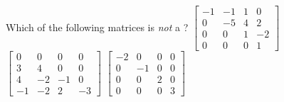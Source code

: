 \begin{activity}
Which of the following matrices is \emph{not} a ?
{\(\begin{bmatrix} -1&-1&1&0
\\0&-5&4&2
\\0&0&1&-2
\\0&0&0&1 \end{bmatrix}\)}
{\(\begin{bmatrix} 0&0&0&0
\\3&4&0&0
\\4&-2&-1&0
\\-1&-2&2&-3 \end{bmatrix}\)}
{\(\begin{bmatrix} -2&0&0&0
\\0&-1&0&0
\\0&0&2&0
\\0&0&0&3 \end{bmatrix}\)}
\end{activity}




